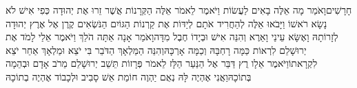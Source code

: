\documentclass[../main/main.tex]{subfiles}
\begin{document}
\begin{multicols*}{\ncols}
חָרָשִׁים\PreVerseSpace{}וָאֹמַר מָה אֵלֶּה בָאִים לַעֲשׂוֹת וַיֹּאמֶר לֵאמֹר אֵלֶּה הַקְּרָנוֹת אֲשֶׁר זֵרוּ אֶת יְהוּדָה כְּפִי אִישׁ לֹא נָשָׂא רֹאשׁוֹ וַיָּבֹאוּ אֵלֶּה לְהַחֲרִיד אֹתָם לְיַדּוֹת אֶת קַרְנוֹת הַגּוֹיִם הַנֹּשְׂאִים קֶרֶן אֶל אֶרֶץ יְהוּדָה לְזָרוֹתָהּ \ClosedSection{}וָאֶשָּׂא עֵינַי וָאֵרֶא וְהִנֵּה אִישׁ וּבְיָדוֹ חֶבֶל מִדָּה\PreVerseSpace{}וָאֹמַר אָנָה אַתָּה הֹלֵךְ וַיֹּאמֶר אֵלַי לָמֹד אֶת יְרוּשָׁלֵם לִרְאוֹת כַּמָּה רָחְבָּהּ וְכַמָּה אָרְכָּהּ\PreVerseSpace{}וְהִנֵּה הַמַּלְאָךְ הַדֹּבֵר בִּי יֹצֵא וּמַלְאָךְ אַחֵר יֹצֵא לִקְרָאתוֹ\PreVerseSpace{}וַיֹּאמֶר אֵלָו רֻץ דַּבֵּר אֶל הַנַּעַר הַלָּז לֵאמֹר פְּרָזוֹת תֵּשֵׁב יְרוּשָׁלֵם מֵרֹב אָדָם וּבְהֵמָה בְּתוֹכָהּ\PreVerseSpace{}וַאֲנִי אֶהְיֶה לָּהּ נְאֻם יַהְוֶה חוֹמַת אֵשׁ סָבִיב וּלְכָבוֹד אֶהְיֶה בְתוֹכָהּ\OpenSection{}\par

\end{multicols*}
\end{document}
